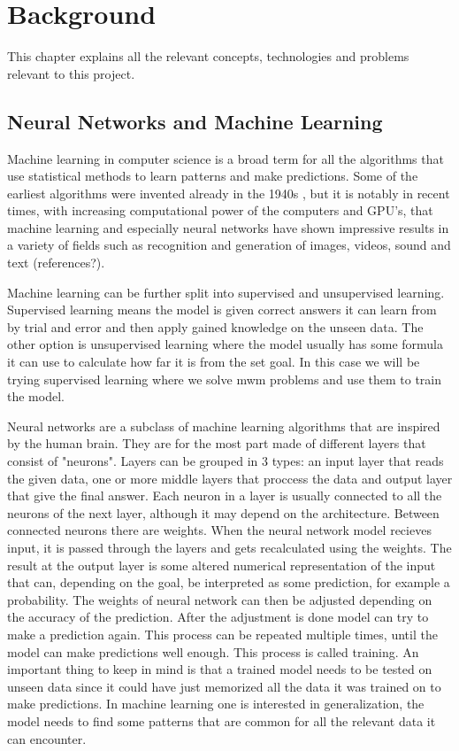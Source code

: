 \chapter{Background}
\label{sec:background}

This chapter explains all the relevant concepts, technologies and problems relevant to this project.

\section{Neural Networks and Machine Learning}

Machine learning in computer science is a broad term for all the algorithms that use statistical methods to learn patterns and make predictions. Some of the earliest algorithms were invented already in the 1940s \cite{mlhist}, but it is notably in recent times, with increasing computational power of the computers and GPU's, that machine learning and especially neural networks have shown impressive results in a variety of fields such as recognition and generation of images, videos, sound and text (references?). 

Machine learning can be further split into supervised and unsupervised learning. Supervised learning means the model is given correct answers it can learn from by trial and error and then apply gained knowledge on the unseen data. The other option is unsupervised learning where the model usually has some formula it can use to calculate how far it is from the set goal. In this case we will be trying supervised learning where we solve \gls{mwm} problems and use them to train the model.

Neural networks are a subclass of machine learning algorithms that are inspired by the human brain. They are for the most part made of different layers that consist of "neurons". Layers can be grouped in 3 types: an input layer that reads the given data, one or more middle layers that proccess the data and output layer that give the final answer. Each neuron in a layer is usually connected to all the neurons of the next layer, although it may depend on the architecture. Between connected neurons there are weights. When the neural network model recieves input, it is passed through the layers and gets recalculated using the weights. The result at the output layer is some altered numerical representation of the input that can, depending on the goal, be interpreted as some prediction, for example a probability. The weights of neural network can then be adjusted depending on the accuracy of the prediction. After the adjustment is done model can try to make a prediction again. This process can be repeated multiple times, until the model can make predictions well enough. This process is called training. An important thing to keep in mind is that a trained model needs to be tested on unseen data since it could have just memorized all the data it was trained on to make predictions. In machine learning one is interested in generalization, the model needs to find some patterns that are common for all the relevant data it can encounter.

